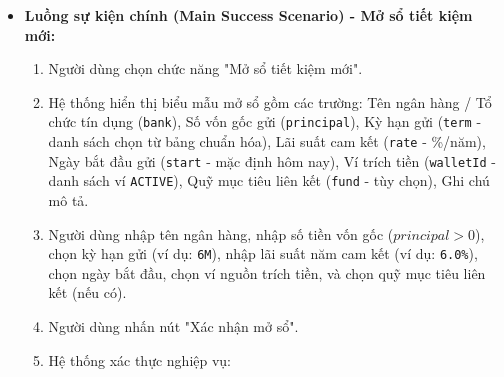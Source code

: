 \documentclass[11pt,a4paper]{article}
\providecommand{\tightlist}{
  \setlength{\itemsep}{0pt}\setlength{\parskip}{0pt}}
\begin{document}
\begin{itemize}
  \begin{enumerate}
  \def\labelenumi{\arabic{enumi}.}
  \tightlist
  \item
    Khi mở sổ: Sổ tiết kiệm mới được lưu vào bảng \texttt{savings} với
    trạng thái \texttt{OPEN}, số dư ví trích tiền giảm đúng bằng số vốn
    gốc \(Principal\), bảo toàn bất biến dòng tiền theo
    \texttt{BR-FIN-02}.
  \item
    Khi tính toán: Hệ thống phản ánh chính xác số ngày gửi thực tế
    \(Days\), tiến độ kỳ hạn \(Process\), lãi dự kiến toàn kỳ
    \(ExpectedInterest\), và giá trị hiện tại \(Balance\).
  \item
    Khi tất toán đúng hạn: Sổ tiết kiệm chuyển trạng thái
    \texttt{SETTLED\_MATURED}, ví thanh khoản nhận trọn vẹn
    \(Payout = Principal + ExpectedInterest\).
  \item
    Khi tất toán trước hạn: Sổ tiết kiệm chuyển trạng thái
    \texttt{SETTLED\_EARLY}, ví thanh khoản nhận
    \(Payout = Principal + ActualInterest\) (theo lãi suất không kỳ
    hạn), phần lãi kỳ hạn chênh lệch được hạch toán là khoản lãi bị hủy
    bỏ.
  \item
    Liên kết quỹ mục tiêu tài chính (nếu có) được cập nhật đồng bộ theo
    \texttt{BR-FIN-08}.
  \end{enumerate}
\item
  \textbf{Luồng sự kiện chính (Main Success Scenario) - Mở sổ tiết kiệm
  mới:}

  \begin{enumerate}
  \def\labelenumi{\arabic{enumi}.}
  \tightlist
  \item
    Người dùng chọn chức năng "Mở sổ tiết kiệm mới".
  \item
    Hệ thống hiển thị biểu mẫu mở sổ gồm các trường: Tên ngân hàng / Tổ
    chức tín dụng (\texttt{bank}), Số vốn gốc gửi (\texttt{principal}),
    Kỳ hạn gửi (\texttt{term} - danh sách chọn từ bảng chuẩn hóa), Lãi
    suất cam kết (\texttt{rate} - \%/năm), Ngày bắt đầu gửi
    (\texttt{start} - mặc định hôm nay), Ví trích tiền
    (\texttt{walletId} - danh sách ví \texttt{ACTIVE}), Quỹ mục tiêu
    liên kết (\texttt{fund} - tùy chọn), Ghi chú mô tả.
  \item
    Người dùng nhập tên ngân hàng, nhập số tiền vốn gốc
    (\(principal > 0\)), chọn kỳ hạn gửi (ví dụ: \texttt{6M}), nhập lãi
    suất năm cam kết (ví dụ: \texttt{6.0\%}), chọn ngày bắt đầu, chọn ví
    nguồn trích tiền, và chọn quỹ mục tiêu liên kết (nếu có).
  \item
    Người dùng nhấn nút "Xác nhận mở sổ".
  \item
    Hệ thống xác thực nghiệp vụ:


\end{enumerate}
\end{itemize}
\end{document}
